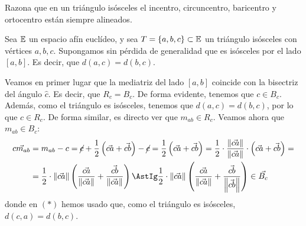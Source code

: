 \documentclass[12pt]{article}
\begin{document}
    \begin{ejercicio}[2 puntos]
        Razona que en un triángulo isósceles el incentro, circuncentro, baricentro y ortocentro están siempre alineados.

        \begin{figure}[H]
            \centering
        \end{figure}
    
        Sea $\mathbb{E}$ un espacio afín euclídeo, y sea $T=\{a,b,c\}\subset \mathbb{E}$ un triángulo isósceles con vértices $a,b,c$.
        Supongamos sin pérdida de generalidad que es isósceles por el lado $[a,b]$. Es decir, que $d(a,c) = d(b,c)$.
    
    
        Veamos en primer lugar que la mediatriz del lado $[a,b]$ coincide con la bisectriz del ángulo $\widehat{c}$. Es decir, que $R_{c} = B_c$.
        De forma evidente, tenemos que $c\in B_c$. Además, como el triángulo es isósceles, tenemos que $d(a,c) = d(b,c)$, por lo que $c\in R_c$.
        De forma similar, es directo ver que $m_{ab}\in R_c$. Veamos ahora que $m_{ab}\in B_c$:
        \begin{align*}
            \vec{cm_{ab}} &= m_{ab} - c = \cancel{c}+\frac{1}{2}\left(\vec{ca} + \vec{cb}\right) - \cancel{c} = \frac{1}{2}\left(\vec{ca} + \vec{cb}\right)
            = \frac{1}{2} \cdot \frac{\left\|\vec{ca}\right\|}{\left\|\vec{ca}\right\|}\cdot \left(\vec{ca} + \vec{cb}\right)
            =\\&= \frac{1}{2} \cdot \left\|\vec{ca}\right\| \left(\frac{\vec{ca}}{\left\|\vec{ca}\right\|} + \frac{\vec{cb}}{\left\|\vec{ca}\right\|}\right)
            \AstIg \frac{1}{2} \cdot \left\|\vec{ca}\right\| \left(\frac{\vec{ca}}{\left\|\vec{ca}\right\|} + \frac{\vec{cb}}{\left\|\vec{cb}\right\|}\right) \in \vec{B_c}
        \end{align*}
        donde en $(\ast)$ hemos usado que, como el triángulo es isósceles, $d(c,a)=d(b,c)$.
    

\end{ejercicio}
\end{document}
